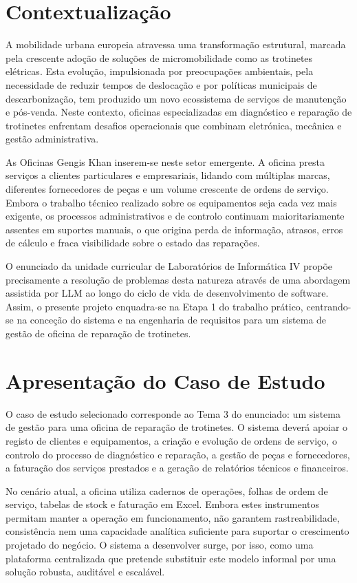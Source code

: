 \documentclass[a4paper,12pt]{scrreprt}
\begin{document}
    \section{Contextualização}
        A mobilidade urbana europeia atravessa uma transformação estrutural, marcada pela crescente adoção de soluções de micromobilidade como as trotinetes elétricas. Esta evolução, impulsionada por preocupações ambientais, pela necessidade de reduzir tempos de deslocação e por políticas municipais de descarbonização, tem produzido um novo ecossistema de serviços de manutenção e pós-venda. Neste contexto, oficinas especializadas em diagnóstico e reparação de trotinetes enfrentam desafios operacionais que combinam eletrónica, mecânica e gestão administrativa.

        As Oficinas Gengis Khan inserem-se neste setor emergente. A oficina presta serviços a clientes particulares e empresariais, lidando com múltiplas marcas, diferentes fornecedores de peças e um volume crescente de ordens de serviço. Embora o trabalho técnico realizado sobre os equipamentos seja cada vez mais exigente, os processos administrativos e de controlo continuam maioritariamente assentes em suportes manuais, o que origina perda de informação, atrasos, erros de cálculo e fraca visibilidade sobre o estado das reparações.

        O enunciado da unidade curricular de Laboratórios de Informática IV propõe precisamente a resolução de problemas desta natureza através de uma abordagem assistida por LLM ao longo do ciclo de vida de desenvolvimento de software. Assim, o presente projeto enquadra-se na Etapa 1 do trabalho prático, centrando-se na conceção do sistema e na engenharia de requisitos para um sistema de gestão de oficina de reparação de trotinetes.
    \section{Apresentação do Caso de Estudo}
        O caso de estudo selecionado corresponde ao Tema 3 do enunciado: um sistema de gestão para uma oficina de reparação de trotinetes. O sistema deverá apoiar o registo de clientes e equipamentos, a criação e evolução de ordens de serviço, o controlo do processo de diagnóstico e reparação, a gestão de peças e fornecedores, a faturação dos serviços prestados e a geração de relatórios técnicos e financeiros.

        No cenário atual, a oficina utiliza cadernos de operações, folhas de ordem de serviço, tabelas de stock e faturação em Excel. Embora estes instrumentos permitam manter a operação em funcionamento, não garantem rastreabilidade, consistência nem uma capacidade analítica suficiente para suportar o crescimento projetado do negócio. O sistema a desenvolver surge, por isso, como uma plataforma centralizada que pretende substituir este modelo informal por uma solução robusta, auditável e escalável.
\end{document}
